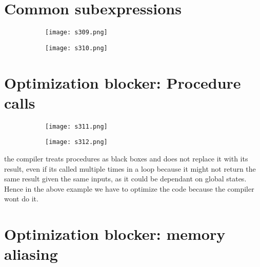 \documentclass[8pt]{extreport}
\begin{document}
\section{Common subexpressions}
\begin{figure}[H]
\centering
\begin{subfigure}[b]{0.4\linewidth}
\texttt{[image: s309.png]}
\end{subfigure}
\begin{subfigure}[b]{0.4\linewidth}
\texttt{[image: s310.png]}
\end{subfigure}
\end{figure}

\section{Optimization blocker: Procedure calls}
\begin{figure}[H]
\centering
\begin{subfigure}[b]{0.4\linewidth}
\texttt{[image: s311.png]}
\end{subfigure}
\begin{subfigure}[b]{0.4\linewidth}
\texttt{[image: s312.png]}
\end{subfigure}
\end{figure}
the compiler treats procedures as black boxes and does not replace it with its result, even if its called multiple times in a loop because it might not return the same result given the same inputs, as it could be dependant on global states.
Hence in the above example we have to optimize the code because the compiler wont do it.

\section{Optimization blocker: memory aliasing}
\end{document}
